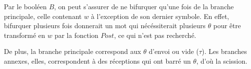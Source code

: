 Par le booléen $B$, on peut s'assurer de ne bifurquer qu'une fois de la branche principale, celle contenant $w$ à l'exception de son dernier symbole. En effet, bifurquer plusieurs fois donnerait un mot qui nécéssiterait plusieurs $\theta$ pour être transformé en $w$ par la fonction $Post$, ce qui n'est pas recherché.

De plus, la branche principale correspond aux $\theta$ d'envoi ou vide ($\tau$). Les branches annexes, elles, correspondent à des réceptions qui ont barré un $\theta$, d'où la scission.


